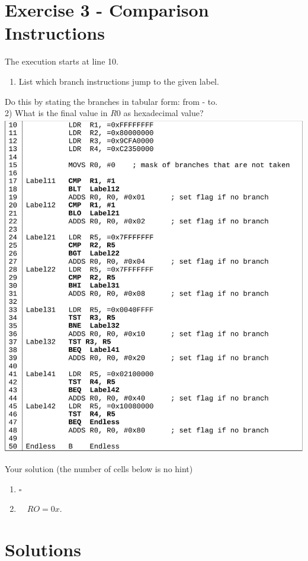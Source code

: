 \section*{Exercise 3 - Comparison Instructions}
The execution starts at line 10.

\begin{enumerate}
  \item List which branch instructions jump to the given label.
\end{enumerate}

Do this by stating the branches in tabular form: from - to.\\
2) What is the final value in $R 0$ as hexadecimal value?\\
\includegraphics[width=\linewidth]{images/2025_01_02_9902c2d2685de638ef73g-4}

Your solution (the number of cells below is no hint)

\begin{enumerate}
  \item $\square$
  \item $\quad R O=0 x$. $\qquad$
\end{enumerate}

\section*{Solutions}
